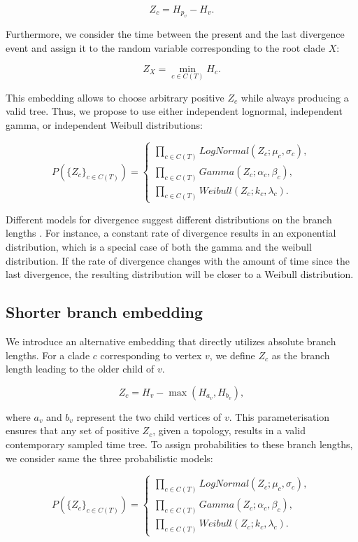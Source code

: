 \documentclass[10pt,letterpaper]{article}
\begin{document}
$$
Z_c = H_{p_v} - H_v.
$$

Furthermore, we consider the time between the present and the last divergence event and assign it to the random variable corresponding to the root clade $X$:

$$
Z_X = \min_{c \in C(T)}{H_c}.
$$

This embedding allows to choose arbitrary positive $Z_c$ while always producing a valid tree. Thus, we propose to use either independent lognormal, independent gamma, or independent Weibull distributions:

$$
P(\{Z_c\}_{c \in C(T)}) = \begin{cases}
	\prod_{c \in C(T)}{LogNormal(Z_c; \mu_c, \sigma_c)}, \\
	\prod_{c \in C(T)}{Gamma(Z_c; \alpha_c, \beta_c)}, \\
	\prod_{c \in C(T)}{Weibull(Z_c; k_c, \lambda_c)}.
\end{cases}
$$

Different models for divergence suggest different distributions on the branch lengths \cite{venditti2010phylogenies}. For instance, a constant rate of divergence results in an exponential distribution, which is a special case of both the gamma and the weibull distribution. If the rate of divergence changes with the amount of time since the last divergence, the resulting distribution will be closer to a Weibull distribution.

\subsection*{Shorter branch embedding}

We introduce an alternative embedding that directly utilizes absolute branch lengths. For a clade $c$ corresponding to vertex $v$, we define $Z_c$ as the branch length leading to the older child of $v$.

$$
Z_c = H_v - \max{\left(H_{a_v}, H_{b_v}\right)},
$$

where $a_v$ and $b_v$ represent the two child vertices of $v$. This parameterisation ensures that any set of positive $Z_c$, given a topology, results in a valid contemporary sampled time tree. To assign probabilities to these branch lengths, we consider same the three probabilistic models:

$$
P(\{Z_c\}_{c \in C(T)}) = \begin{cases}
	\prod_{c \in C(T)}{LogNormal(Z_c; \mu_c, \sigma_c)}, \\
	\prod_{c \in C(T)}{Gamma(Z_c; \alpha_c, \beta_c)}, \\
	\prod_{c \in C(T)}{Weibull(Z_c; k_c, \lambda_c)}.
\end{cases}
$$
\end{document}
